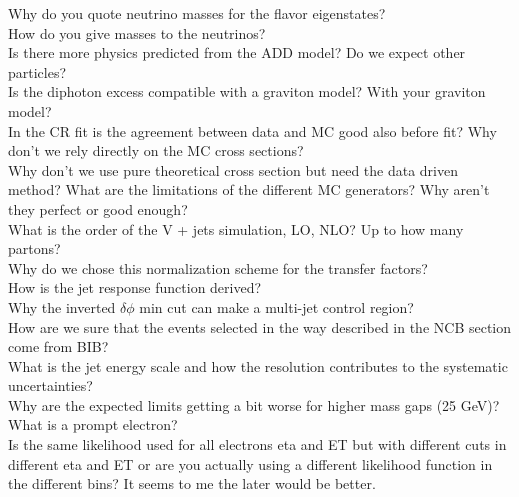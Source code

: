 \documentclass[a4paper,10pt,twoside,notitlepage]{article}
\begin{document}
\begin{description}
\item[Why do you quote neutrino masses for the flavor eigenstates?]

\item[How do you give masses to the neutrinos?]

\item[Is there more physics predicted from the ADD model? Do we expect other
  particles?]

\item[Is the diphoton excess compatible with a graviton model? With your
  graviton model?]

\item[In the CR fit is the agreement between data and MC good also before fit?
  Why don't we rely directly on the MC cross sections?]

\item[Why don't we use pure theoretical cross section but need the data driven
  method? What are the limitations of the different MC generators? Why aren't
  they perfect or good enough?]

\item[What is the order of the V + jets simulation, LO, NLO? Up to how many
  partons?]

\item[Why do we chose this normalization scheme for the transfer factors?]

\item[How is the jet response function derived?]

\item[Why the inverted $\delta \phi$ min cut can make a multi-jet control
  region?]

\item[How are we sure that the events selected in the way described in the NCB
  section come from BIB?]

\item[What is the jet energy scale and how the resolution contributes to the
  systematic uncertainties?]

\item[Why are the expected limits getting a bit worse for higher mass gaps (25
  GeV)?]

\item[What is a prompt electron?]

\item[Is the same likelihood used for all electrons eta and ET but with
  different cuts in different eta and ET or are you actually using a different
  likelihood function in the different bins? It seems to me the later would be
  better.]


\end{description}
\end{document}
